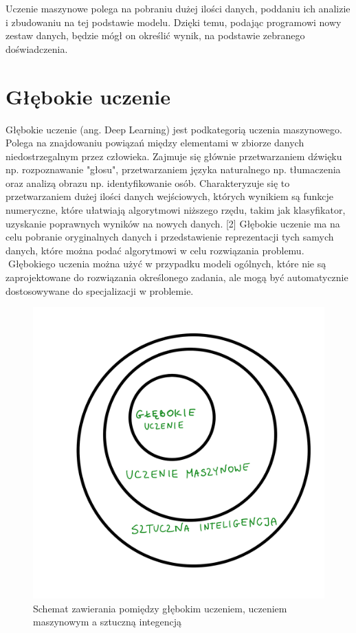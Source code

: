 \documentclass[brudnopis]{xmgr}
\begin{document}
Uczenie maszynowe polega na pobraniu dużej ilości danych, poddaniu ich analizie i zbudowaniu na tej podstawie modelu. Dzięki temu, podając programowi nowy zestaw danych, będzie mógł on określić wynik, na podstawie zebranego doświadczenia. 

\section{Głębokie uczenie }

Głębokie uczenie (ang. Deep Learning) jest podkategorią uczenia maszynowego. Polega na znajdowaniu powiązań między elementami w zbiorze danych niedostrzegalnym przez człowieka. Zajmuje się głównie przetwarzaniem dźwięku np. rozpoznawanie "głosu", przetwarzaniem języka naturalnego np. tłumaczenia oraz analizą obrazu np. identyfikowanie osób. Charakteryzuje się to przetwarzaniem dużej ilości danych wejściowych, których wynikiem są funkcje numeryczne, które ułatwiają algorytmowi niższego rzędu, takim jak klasyfikator, uzyskanie poprawnych wyników na nowych danych. [2] Głębokie uczenie ma na celu pobranie oryginalnych danych i przedstawienie reprezentacji tych samych danych, które można podać algorytmowi w celu rozwiązania problemu. 
􏰁Głębokiego uczenia można użyć w przypadku modeli ogólnych, które nie są zaprojektowane do rozwiązania określonego zadania, ale mogą być automatycznie dostosowywane do specjalizacji w problemie.


\begin{figure}[!tbh]
\centering
\includegraphics[width=.8\hsize]{fig/1}
\caption{Schemat zawierania pomiędzy głębokim uczeniem, uczeniem maszynowym a sztuczną integencją\label{RYS.1}}
\end{figure}
\end{document}
